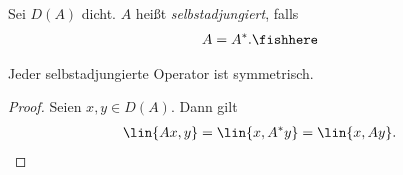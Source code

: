 \begin{defn}
\label{defn:8.8}
Sei $D(A)$ dicht. $A$ heißt \emph{selbstadjungiert}, falls
\begin{align*}
A = A^*.\fishhere
\end{align*}
\end{defn}

\begin{prop}
\label{prop:8.9}
Jeder selbstadjungierte Operator ist symmetrisch.\fishhere
\end{prop}
\begin{proof}
Seien $x,y\in D(A)$. Dann gilt
\begin{align*}
\lin{Ax,y} = \lin{x,A^*y} =\lin{x,Ay}.\qedhere
\end{align*}
\end{proof}

